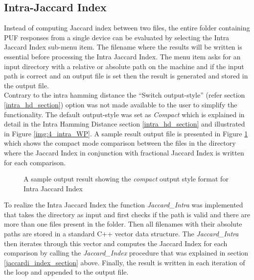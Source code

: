 \subsection{Intra-Jaccard Index}
Instead of computing Jaccard index between two files, the entire folder containing PUF responses from a single device can be evaluated by selecting the Intra Jaccard Index sub-menu item. The filename where the results will be written is essential before processing the Intra Jaccard Index. The menu item asks for an input directory with a relative or absolute path on the machine and if the input path is correct and an output file is set then the result is generated and stored in the
output file.\\

Contrary to the intra hamming distance the ``Switch output-style'' (refer section \ref{intra_hd_section}) option was not made available to the user to simplify the functionality. The default output-style was set as \emph{Compact} which is explained in detail in the Intra Hamming Distance section \ref{intra_hd_section} and illustrated in Figure \ref{img:4_intra_WP}. A sample result output file is presented in Figure \ref{img:intra_jaccardi_compact} which shows the compact mode comparison between the files in the
directory where the Jaccard Index in conjunction with fractional Jaccard Index is written for each comparison.\\

\begin{figure}[h]
\centering
{}
\caption{A sample output result showing the \emph{compact} output style format for Intra Jaccard Index }
\label{img:intra_jaccardi_compact}
\end{figure}

To realize the Intra Jaccard Index the function \emph{Jaccard\_Intra} was implemented that takes the directory as input and first checks if the path is valid and there are more than one files present in the folder. Then all filenames with their absolute paths are stored in a standard C++ vector data structure. The \emph{Jaccard\_Intra} then iterates through this vector and computes the Jaccard Index for each comparison by calling the \emph{Jaccard\_Index} procedure that was explained in  section
\ref{jaccardi_index_section}
above. Finally, the result is written in each iteration of the loop and appended to the output file.\\

